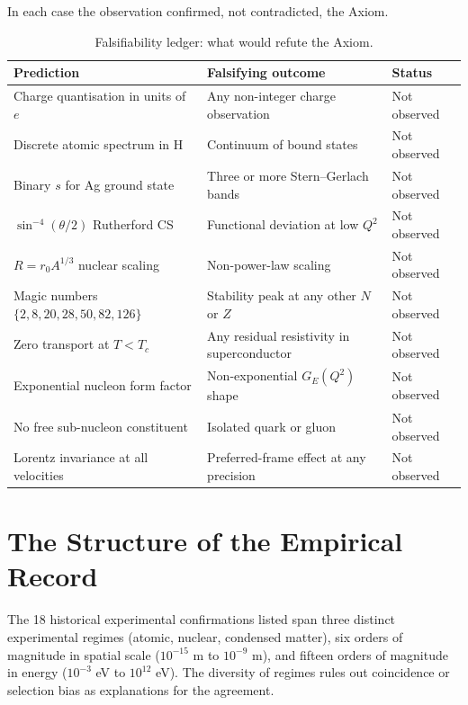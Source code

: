 In each case the observation confirmed, not contradicted, the Axiom.

\begin{table}[htbp]
\centering
\caption{Falsifiability ledger: what would refute the Axiom.}
\label{tab:falsifiability}
\begin{tabular}{@{}p{5cm}p{5cm}l@{}}
\toprule
Prediction & Falsifying outcome & Status \\
\midrule
Charge quantisation in units of $e$ &
  Any non-integer charge observation &
  Not observed \\
Discrete atomic spectrum in H &
  Continuum of bound states &
  Not observed \\
Binary $s$ for Ag ground state &
  Three or more Stern--Gerlach bands &
  Not observed \\
$\sin^{-4}(\theta/2)$ Rutherford CS &
  Functional deviation at low $Q^2$ &
  Not observed \\
$R=r_0 A^{1/3}$ nuclear scaling &
  Non-power-law scaling &
  Not observed \\
Magic numbers $\{2,8,20,28,50,82,126\}$ &
  Stability peak at any other $N$ or $Z$ &
  Not observed \\
Zero transport at $T<T_c$ &
  Any residual resistivity in superconductor &
  Not observed \\
Exponential nucleon form factor &
  Non-exponential $G_E(Q^2)$ shape &
  Not observed \\
No free sub-nucleon constituent &
  Isolated quark or gluon &
  Not observed \\
Lorentz invariance at all velocities &
  Preferred-frame effect at any precision &
  Not observed \\
\bottomrule
\end{tabular}
\end{table}

\section*{The Structure of the Empirical Record}

The 18 historical experimental confirmations listed span three distinct
experimental regimes (atomic, nuclear, condensed matter), six orders of
magnitude in spatial scale ($10^{-15}$ m to $10^{-9}$ m), and fifteen
orders of magnitude in energy ($10^{-3}$ eV to $10^{12}$ eV).  The
diversity of regimes rules out coincidence or selection bias as explanations
for the agreement.


